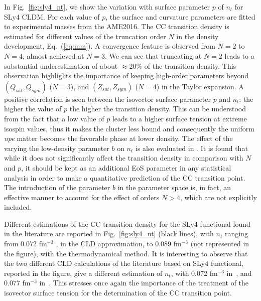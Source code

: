 In Fig.~\ref{fig:sly4_nt}, we show the variation with surface parameter $p$ of 
$n_t$ for SLy4 CLDM. For each value of $p$, the surface and curvature 
parameters are fitted to experimental masses from the AME2016. 
The CC transition density is estimated for different 
values of the truncation order $N$ in the density development, 
Eq.~(\ref{eq:mm}). A convergence feature is observed from $N=2$ to $N=4$,
almost achieved at $N=3$. We can see that truncating at $N=2$ leads to a 
substantial underestimation of about $\approx 20\%$ of the transition density. 
This observation highlights the importance of keeping high-order 
parameters beyond $(Q_{sat},Q_{sym})$ ($N=3$), and $(Z_{sat},Z_{sym})$ ($N=4$)
in the Taylor expansion. 
A positive correlation is seen between the isovector surface parameter $p$ and 
$n_t$: the higher the value of $p$ the higher the transition density. This can 
be understood from the fact that a low value of $p$ leads to a higher surface 
tension at extreme isospin values, thus it makes the cluster less bound and
consequently the uniform \textit{npe} matter becomes the favorable phase at 
lower density. 
The effect of the varying the low-density parameter $b$ on $n_t$ is also 
evaluated in \cite{Carreau2019cc}. It is found that while it does not 
significantly affect the transition density in comparison with $N$ and $p$, it 
should be kept as an additional EoS parameter in any statistical analysis in
order to make a quantitative prediction of the CC transition point.
{The introduction of the parameter $b$ in the parameter space is, in fact, 
  an effective manner to account for the effect of orders $N>4$, which are not
explicitly included.}

Different estimations of the CC transition density for the SLy4 functional
found in the literature are reported in Fig.~\ref{fig:sly4_nt} (black lines), 
with $n_t$ ranging from 0.072 fm$^{-3}$ \cite{Vinas2017}, in the 
CLD approximation, to 0.089 fm$^{-3}$ \cite{Ducoin2011} (not represented in the 
figure), with the thermodynamical method. It is interesting to observe that 
the {two different} CLD calculations {of the literature based on
SLy4 functional, reported in the figure}, give a different estimation of 
$n_t$, with 0.072 fm$^{-3}$ in~\cite{Vinas2017}, and 0.077 fm$^{-3}$ 
in~\cite{Douchin2000a}. This stresses once again the importance of the 
treatment of the isovector surface tension for the determination of the CC 
transition point.

